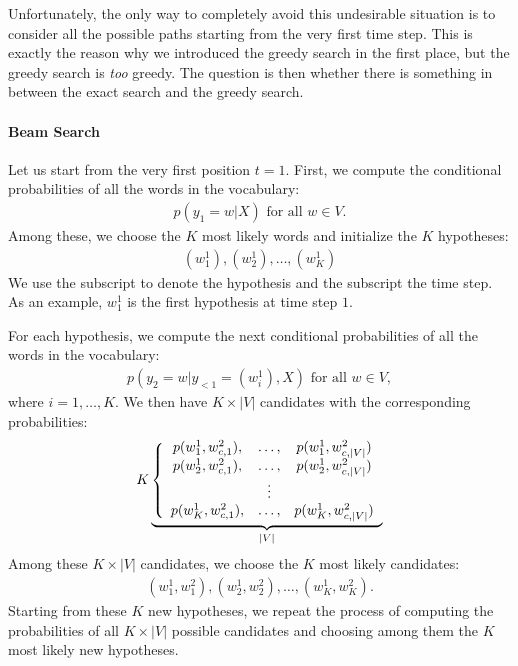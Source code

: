 \documentclass{report}
\begin{document}
Unfortunately, the only way to completely avoid this undesirable situation is to
consider all the possible paths starting from the very first time step. This is
exactly the reason why we introduced the greedy search in the first place, but
the greedy search is {\em too} greedy. The question is then whether there is
something in between the exact search and the greedy search.

\paragraph{Beam Search}

Let us start from the very first position $t=1$. First, we compute the
conditional probabilities of all the words in the vocabulary:
\begin{align*}
    p(y_1=w|X)\text{ for all }w\in V.
\end{align*}
Among these, we choose the $K$ most likely words and initialize the $K$
hypotheses:
\begin{align*}
    (w_1^1),(w_2^1), \ldots, (w_K^1)
\end{align*}
We use the subscript to denote the hypothesis and the subscript the time step.
As an example, $w_1^1$ is the first hypothesis at time step $1$.

For each hypothesis, we compute the next conditional probabilities of all the
words in the vocabulary:
\begin{align*}
    p(y_2=w|y_{<1}=(w_i^1), X)\text{ for all }w \in V,
\end{align*}
where $i=1, \ldots, K$. 
We then have $K \times |V|$ candidates with the corresponding probabilities:
\begin{align*}
    K \underbrace{\left\{
        \begin{array}{c c c}
                p(w_1^1, w_{c,1}^2),& \ldots,& p(w_1^1, w_{c,|V|}^2) \\
                p(w_2^1, w_{c,1}^2),& \ldots,& p(w_2^1, w_{c,|V|}^2) \\
                                   &\vdots& \\
            p(w_K^1, w_{c,1}^2),& \ldots,& p(w_K^1, w_{c,|V|}^2) \\
        \end{array}
    \right.}_{|V|}
\end{align*}
Among these $K \times |V|$ candidates, we choose the $K$ most likely candidates:
\begin{align*}
    (w_1^1, w_1^2), (w_2^1, w_2^2), \ldots, (w_K^1,w_K^2).
\end{align*}
Starting from these $K$ new hypotheses, we repeat the process of computing the
probabilities of all $K \times |V|$ possible candidates and choosing among them
the $K$ most likely new hypotheses. 
\end{document}
